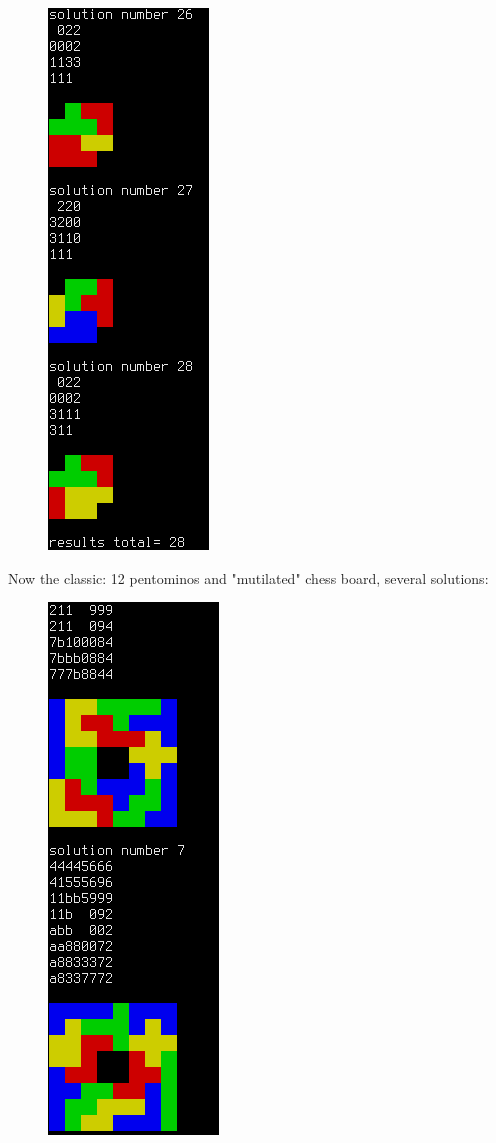 \begin{figure}[H]
\centering
\includegraphics[scale=1]{SMT/tiling/small.png}
\caption{}
\end{figure}

Now the classic: 12 pentominos and "mutilated" chess board, several solutions:

\begin{figure}[H]
\centering
\includegraphics[scale=1]{SMT/tiling/big1.png}
\caption{}
\end{figure}

